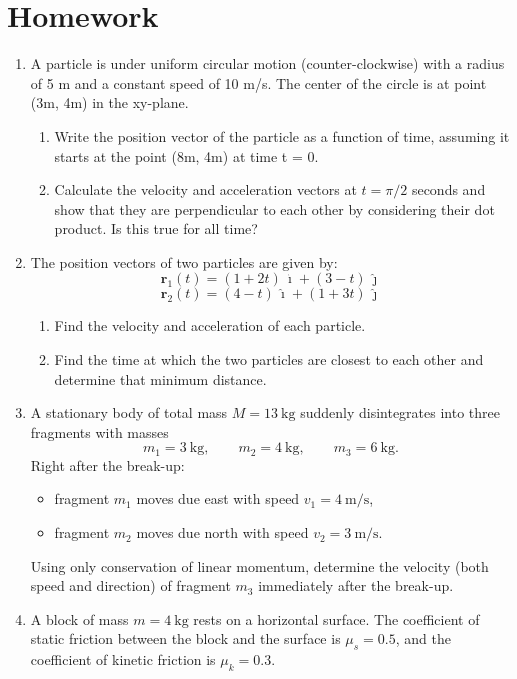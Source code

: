 \documentclass[../main.tex]{subfiles}
\begin{document}
\section{Homework}
\begin{enumerate}
    \item A particle is under uniform circular motion (counter-clockwise) with a radius of 5 m and a constant speed of 10 m/s. The center of the circle is at point (3m, 4m) in the xy-plane. 
    \begin{enumerate}
      \item Write the position vector of the particle as a function of time, assuming it starts at the point (8m, 4m) at time t = 0.
      \item Calculate the velocity and acceleration vectors at $t=\pi/2$ seconds and show that they are perpendicular to each other by considering their dot product. Is this true for all time?
    \end{enumerate}


    \item The position vectors of two particles are given by:
    \[\mathbf{r}_1(t) = (1 + 2t)\,\hat{\imath} + (3 - t)\,\hat{\jmath}\]
    \[\mathbf{r}_2(t) = (4 - t)\,\hat{\imath} + (1 + 3t)\,\hat{\jmath}\]
    \begin{enumerate}
        \item Find the velocity and acceleration of each particle.
        \item Find the time at which the two particles are closest to each other and determine that minimum distance.
    \end{enumerate}
    \item A stationary body of total mass $M = 13\ \text{kg}$ suddenly disintegrates into three fragments with masses
\[
m_1 = 3\ \text{kg}, \qquad m_2 = 4\ \text{kg}, \qquad m_3 = 6\ \text{kg}.
\]
Right after the break-up:
\begin{itemize}
    \item fragment $m_1$ moves due east with speed $v_1 = 4\ \text{m/s}$,
    \item fragment $m_2$ moves due north with speed $v_2 = 3\ \text{m/s}$.
\end{itemize}
Using only conservation of linear momentum, determine the velocity (both speed and direction) of fragment $m_3$ immediately after the break-up. 

\item A block of mass $m = 4~\mathrm{kg}$ rests on a horizontal surface. The coefficient of static friction between the block and the surface is $\mu_s = 0.5$, and the coefficient of kinetic friction is $\mu_k = 0.3$.


\end{enumerate}
\end{document}
